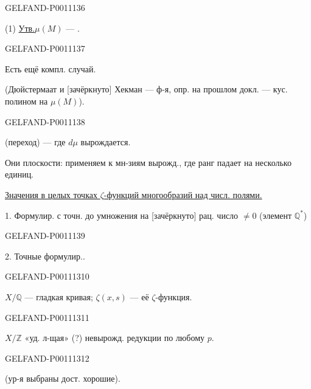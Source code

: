 \begin{GelfandAdjacentEvidence}{GELFAND-P001113}{6}


(1) \underline{Утв.}\quad $\mu(M)$ — .

\end{GelfandAdjacentEvidence}
\begin{GelfandAdjacentEvidence}{GELFAND-P001113}{7}


Есть ещё компл. случай.

(Дюйстермаат и [зачёркнуто] Хекман — ф-я, опр. на прошлом докл. — кус. полином на $\mu(M)$).
\end{GelfandAdjacentEvidence}
\begin{GelfandAdjacentEvidence}{GELFAND-P001113}{8}


 (переход) — где $d\mu$ вырождается.

Они плоскости: применяем к мн-зиям вырожд., где ранг падает на несколько единиц.


\underline{Значения в целых точках $\zeta$-функций многообразий над числ. полями.}

1. Формулир. с точн. до умножения на [зачёркнуто] рац. число $\ne0$ (элемент $\mathbb Q^*$)
\end{GelfandAdjacentEvidence}
\begin{GelfandAdjacentEvidence}{GELFAND-P001113}{9}


2. Точные формулир..

\end{GelfandAdjacentEvidence}
\begin{GelfandAdjacentEvidence}{GELFAND-P001113}{10}


$X/\mathbb Q$ — гладкая кривая; \quad $\zeta(x,s)$ — её $\zeta$-функция.

\end{GelfandAdjacentEvidence}
\begin{GelfandAdjacentEvidence}{GELFAND-P001113}{11}


$X/\mathbb Z$ «уд. л-щая» (?) невырожд. редукции по любому $p$.
\end{GelfandAdjacentEvidence}
\begin{GelfandAdjacentEvidence}{GELFAND-P001113}{12}


(ур-я выбраны дост. хорошие).

\end{GelfandAdjacentEvidence}



